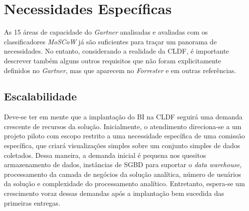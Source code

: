 \section{Necessidades Específicas}
\label{sec-especificas}

    As 15 áreas de capacidade do \emph{Gartner}
    analisadas e avaliadas com os classificadores \emph{MoSCoW} já são suficientes para traçar um panorama de necessidades. No entanto, considerando a realidade da CLDF, é importante descrever também alguns outros requisitos que não foram explicitamente definidos no \emph{Gartner}, mas que aparecem no \emph{Forrester} e em outras referências. 

\subsection{Escalabilidade} \label{sec-escalabilidade}

Deve-se ter em mente que a implantação do BI na CLDF seguirá uma demanda crescente de recursos da solução. Inicialmente, o atendimento direciona-se a um projeto piloto com escopo restrito a uma necessidade específica de uma comissão específica, que criará visualizações simples sobre um conjunto simples de dados coletados. Dessa maneira, a demanda inicial é pequena nos quesitos armazenamento de dados, instâncias de SGBD para suportar o \emph{data warehouse}, processamento da camada de negócios da solução analítica, número de usuários da solução e complexidade do processamento analítico. Entretanto, espera-se um crescimento voraz dessas demandas após a implantação bem sucedida das primeiras entregas.

